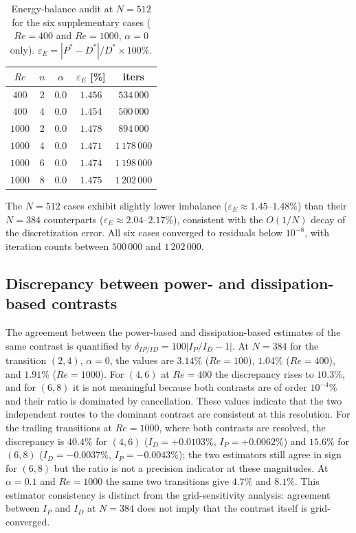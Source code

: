 \begin{table}[!htbp]
\centering
\caption{Energy-balance audit at $N=512$ for the six supplementary cases ($Re=400$ and $Re=1000$, $\alpha=0$ only). $\varepsilon_E = |P^*-D^*|/D^* \times 100\%$.}
\label{supptab:balance512}
\begin{tabular}{@{}ccccc@{}}
\hline
$Re$ & $n$ & $\alpha$ & $\varepsilon_E$ [\%] & iters \\
\hline
$400$  & $2$ & $0.0$  & $1.456$ & $534\,000$ \\
$400$  & $4$ & $0.0$  & $1.454$ & $500\,000$ \\
$1000$ & $2$ & $0.0$  & $1.478$ & $894\,000$ \\
$1000$ & $4$ & $0.0$  & $1.471$ & $1\,178\,000$ \\
$1000$ & $6$ & $0.0$  & $1.474$ & $1\,198\,000$ \\
$1000$ & $8$ & $0.0$  & $1.475$ & $1\,202\,000$ \\
\hline
\end{tabular}
\end{table}

The $N=512$ cases exhibit slightly lower imbalance ($\varepsilon_E \approx 1.45$--$1.48\%$) than their $N=384$ counterparts ($\varepsilon_E \approx 2.04$--$2.17\%$), consistent with the $O(1/N)$ decay of the discretization error. All six cases converged to residuals below $10^{-8}$, with iteration counts between $500\,000$ and $1\,202\,000$.

\subsection{Discrepancy between power- and dissipation-based contrasts}

The agreement between the power-based and dissipation-based estimates of the same contrast is quantified by $\delta_{IP/ID} = 100|I_P/I_D-1|$. At $N=384$ for the transition $(2,4)$, $\alpha=0$, the values are $3.14\%$ ($Re=100$), $1.04\%$ ($Re=400$), and $1.91\%$ ($Re=1000$). For $(4,6)$ at $Re=400$ the discrepancy rises to $10.3\%$, and for $(6,8)$ it is not meaningful because both contrasts are of order $10^{-4}\%$ and their ratio is dominated by cancellation. These values indicate that the two independent routes to the dominant contrast are consistent at this resolution. For the trailing transitions at $Re=1000$, where both contrasts are resolved, the discrepancy is $40.4\%$ for $(4,6)$ ($I_D=+0.0103\%$, $I_P=+0.0062\%$) and $15.6\%$ for $(6,8)$ ($I_D=-0.0037\%$, $I_P=-0.0043\%$); the two estimators still agree in sign for $(6,8)$ but the ratio is not a precision indicator at these magnitudes. At $\alpha=0.1$ and $Re=1000$ the same two transitions give $4.7\%$ and $8.1\%$. This estimator consistency is distinct from the grid-sensitivity analysis: agreement between $I_P$ and $I_D$ at $N=384$ does not imply that the contrast itself is grid-converged.

